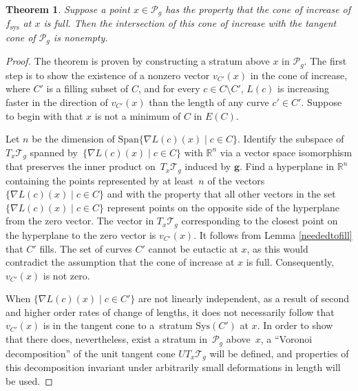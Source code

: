\documentclass[pdftex]{sigma}
\numberwithin{equation}{section}
\newtheorem{Theorem}{Theorem}[section]
\begin{document}
\begin{Theorem}
\label{balancedthm2}
Suppose a point $x\in \mathcal{P}_{g}$ has the property that the cone of increase of $f_{\mathrm{sys}}$ at $x$ is full. Then the intersection of this cone of increase with the tangent cone of $\mathcal{P}_{g}$ is nonempty.
\end{Theorem}
\begin{proof}
The theorem is proven by constructing a stratum above $x$ in $\mathcal{P}_{g}$. The first step is to show the existence of a nonzero vector $v_{C'}(x)$ in the cone of increase, where $C'$ is a filling subset of $C$, and for every $c\in C\setminus C'$, $L(c)$ is increasing faster in the direction of $v_{C'}(x)$ than the length of any curve $c'\in C'$. Suppose to begin with that $x$ is not a minimum of $C$ in $E(C)$.

Let $n$ be the dimension of $\mathrm{Span}\{\nabla L(c)(x) \mid c\in C\}$. Identify the subspace of $T_{x}\mathcal{T}_{g}$ spanned by~$\{\nabla L(c)(x) \mid c\in C\}$ with $\mathbb{R}^{n}$ via a vector space isomorphism that preserves the inner product on~$T_{x}\mathcal{T}_{g}$ induced by $\mathbf{g}$. Find a hyperplane in $\mathbb{R}^{n}$ containing the points represented by at least~$n$ of the vectors $\{\nabla L(c)(x) \mid c\in C\}$ and with the property that all other vectors in the set~$\{\nabla L(c)(x) \mid c\in C\}$ represent points on the opposite side of the hyperplane from the zero vector. The vector in $T_{x}\mathcal{T}_{g}$ corresponding to the closest point on the hyperplane to the zero vector is $v_{C'}(x)$. It follows from Lemma \ref{neededtofill} that $C'$ fills. The set of curves $C'$ cannot be eutactic at $x$, as this would contradict the assumption that the cone of increase at $x$ is full. Consequently, $v_{C'}(x)$ is not zero.

When $\{\nabla L(c)(x) \mid c\in C'\}$ are not linearly independent, as a result of second and higher order rates of change of lengths, it does not necessarily follow that $v_{C'}(x)$ is in the tangent cone to a~stratum $\mathrm{Sys}(C')$ at $x$. In order to show that there does, nevertheless, exist a stratum in~$\mathcal{P}_{g}$ above~$x$, a ``Voronoi decomposition'' of the unit tangent cone $UT_{x}\mathcal{T}_{g}$ will be defined, and properties of this decomposition invariant under arbitrarily small deformations in length will be used.


\end{proof}
\end{document}
